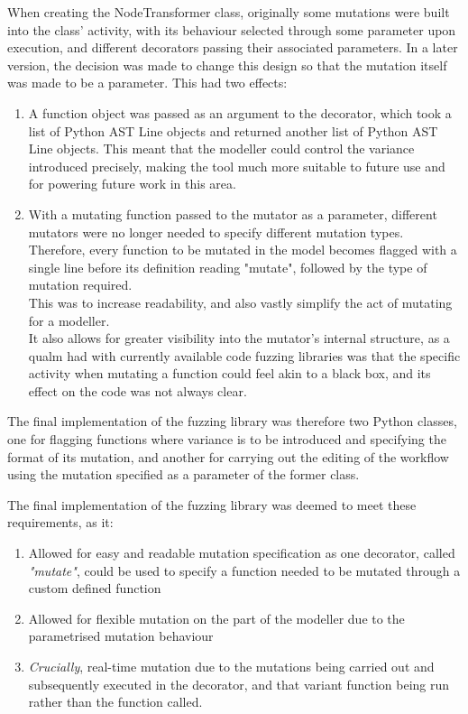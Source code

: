 {When creating the NodeTransformer class, originally some mutations were built into the class' activity, with its behaviour selected through some parameter upon execution, and different decorators passing their associated parameters. In a later version, the decision was made to change this design so that the mutation itself was made to be a parameter. This had two effects: 

\begin{enumerate}
    \item A function object was passed as an argument to the decorator, which took a list of Python AST Line objects and returned another list of Python AST Line objects. This meant that the modeller could control the variance introduced precisely, making the tool much more suitable to future use and for powering future work in this area.
    \item With a mutating function passed to the mutator as a parameter, different mutators were no longer needed to specify different mutation types. Therefore, every function to be mutated in the model becomes flagged with a single line before its definition reading "mutate", followed by the type of mutation required.\\
    This was to increase readability, and also vastly simplify the act of mutating for a modeller.\\
    It also allows for greater visibility into the mutator's internal structure, as a qualm had with currently available code fuzzing libraries was that the specific activity when mutating a function could feel akin to a black box, and its effect on the code was not always clear.
\end{enumerate}\par

The final implementation of the fuzzing library was therefore two Python classes, one for flagging functions where variance is to be introduced and specifying the format of its mutation, and another for carrying out the editing of the workflow using the mutation specified as a parameter of the former class.\par

The final implementation of the fuzzing library was deemed to meet these requirements, as it: 

\begin{enumerate}  %
    \item Allowed for easy and readable mutation specification as one decorator, called \emph{"mutate"}, could be used to specify a function needed to be mutated through a custom defined function
    \item Allowed for flexible mutation on the part of the modeller due to the parametrised mutation behaviour
    \item \emph{Crucially}, real-time mutation due to the mutations being carried out and subsequently executed in the decorator, and that variant function being run rather than the function called.
\end{enumerate} \par

}

